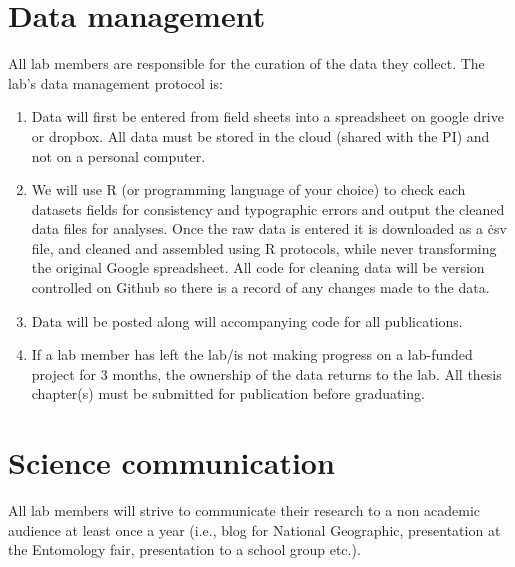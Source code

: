 \documentclass[12pt]{article}
\begin{document}
\section{Data management}
All lab members are responsible for the curation of the data they
collect. The lab's data management protocol is:

\begin{enumerate}
\item Data will first be entered from field sheets into a spreadsheet
  on google drive or dropbox. All data must be stored in the cloud
  (shared with the PI) and not on a personal computer.
\item We will use R (or programming language of your choice) to check
  each datasets fields for consistency and typographic errors and
  output the cleaned data files for analyses. Once the raw data is entered
  it is downloaded as a \.csv file, and cleaned and
  assembled using R protocols, while never transforming the original
  Google spreadsheet. All code for cleaning data will be version
  controlled on Github so there is a record of any changes made to the
  data.
\item Data will be posted along will accompanying code for all
  publications.
\item If a lab member has left the lab/is not making progress on a
  lab-funded project for 3 months, the ownership of the data returns
  to the lab. All thesis chapter(s) must be submitted for publication
  before graduating.
\end{enumerate}

\section{Science communication}
All lab members will strive to communicate their research to a non academic
audience at least once a year (i.e., blog for National Geographic,
presentation at the Entomology fair, presentation to a school group
etc.).
\end{document}
